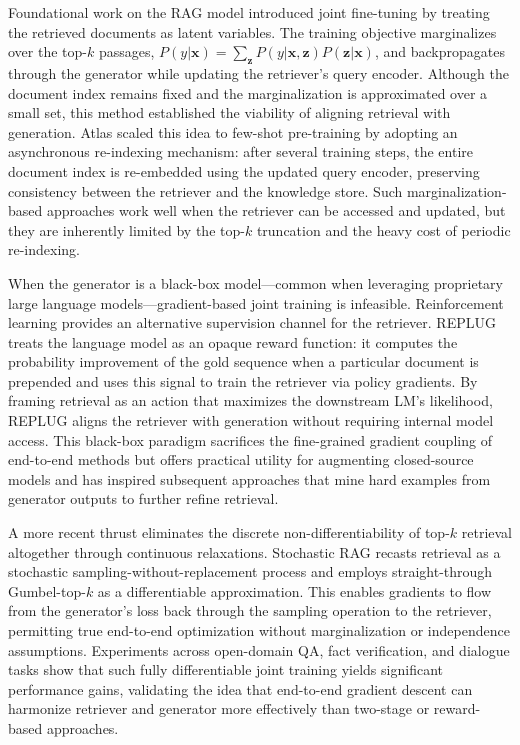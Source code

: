 \documentclass[11pt,a4paper]{article}
\begin{document}
Foundational work on the RAG model \cite{arxiv:2005.11401v4} introduced joint fine-tuning by treating the retrieved documents as latent variables. The training objective marginalizes over the top-\(k\) passages, \(P(y|\mathbf{x}) = \sum_{\mathbf{z}} P(y|\mathbf{x},\mathbf{z}) P(\mathbf{z}|\mathbf{x})\), and backpropagates through the generator while updating the retriever's query encoder. Although the document index remains fixed and the marginalization is approximated over a small set, this method established the viability of aligning retrieval with generation. Atlas \cite{arxiv:2208.03299v3} scaled this idea to few-shot pre-training by adopting an asynchronous re-indexing mechanism: after several training steps, the entire document index is re-embedded using the updated query encoder, preserving consistency between the retriever and the knowledge store. Such marginalization-based approaches work well when the retriever can be accessed and updated, but they are inherently limited by the top-\(k\) truncation and the heavy cost of periodic re-indexing.

When the generator is a black-box model---common when leveraging proprietary large language models---gradient-based joint training is infeasible. Reinforcement learning provides an alternative supervision channel for the retriever. REPLUG \cite{arxiv:2301.12652v4} treats the language model as an opaque reward function: it computes the probability improvement of the gold sequence when a particular document is prepended and uses this signal to train the retriever via policy gradients. By framing retrieval as an action that maximizes the downstream LM's likelihood, REPLUG aligns the retriever with generation without requiring internal model access. This black-box paradigm sacrifices the fine-grained gradient coupling of end-to-end methods but offers practical utility for augmenting closed-source models and has inspired subsequent approaches that mine hard examples from generator outputs to further refine retrieval.

A more recent thrust eliminates the discrete non-differentiability of top-\(k\) retrieval altogether through continuous relaxations. Stochastic RAG \cite{arxiv:2405.02816v1} recasts retrieval as a stochastic sampling-without-replacement process and employs straight-through Gumbel-top-\(k\) as a differentiable approximation. This enables gradients to flow from the generator's loss back through the sampling operation to the retriever, permitting true end-to-end optimization without marginalization or independence assumptions. Experiments across open-domain QA, fact verification, and dialogue tasks show that such fully differentiable joint training yields significant performance gains, validating the idea that end-to-end gradient descent can harmonize retriever and generator more effectively than two-stage or reward-based approaches.
\end{document}
